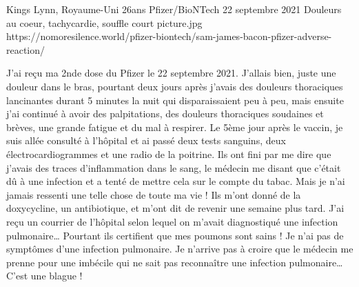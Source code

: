           {Kings Lynn, Royaume-Uni}
          {26ans}
          {Pfizer/BioNTech}
          {22 septembre 2021}
          {Douleurs au coeur, tachycardie, souffle court}
          {picture.jpg}
          {https://nomoresilence.world/pfizer-biontech/sam-james-bacon-pfizer-adverse-reaction/}
          {

J'ai reçu ma 2nde dose du Pfizer le 22 septembre 2021. J'allais bien, juste une
douleur dans le bras, pourtant deux jours après j'avais des douleurs thoraciques
lancinantes durant 5 minutes la nuit qui disparaissaient peu à peu, mais ensuite
j'ai continué à avoir des palpitations, des douleurs thoraciques soudaines et
brèves, une grande fatigue et du mal à respirer. Le 5ème jour après le vaccin,
je suis allée consulté à l'hôpital et ai passé deux tests sanguins, deux
électrocardiogrammes et une radio de la poitrine. Ils ont fini par me dire que
j'avais des traces d'inflammation dans le sang, le médecin me disant que c'était
dû à une infection et a tenté de mettre cela sur le compte du tabac. Mais je
n'ai jamais ressenti une telle chose de toute ma vie ! Ils m'ont donné de la
doxycycline, un antibiotique, et m'ont dit de revenir une semaine plus
tard. J'ai reçu un courrier de l'hôpital selon lequel on m'avait diagnostiqué
une infection pulmonaire… Pourtant ils certifient que mes poumons sont sains !
Je n'ai pas de symptômes d'une infection pulmonaire. Je n'arrive pas à croire
que le médecin me prenne pour une imbécile qui ne sait pas reconnaître une
infection pulmonaire… C'est une blague !

}
